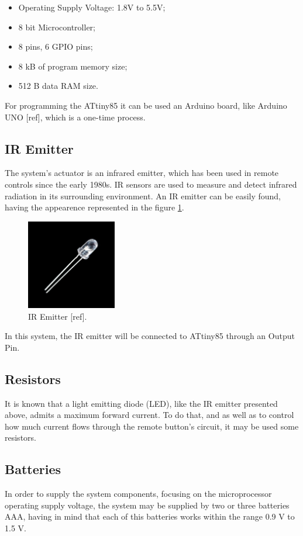 \documentclass[12pt, letterpaper]{report}
\begin{document}
\begin{itemize}
	\item Operating Supply Voltage: 1.8V to 5.5V;
	\item 8 bit Microcontroller;
	\item 8 pins, 6 GPIO pins;
	\item 8 kB of program memory size;
	\item 512 B data RAM size.
\end{itemize}

For programming the ATtiny85 it can be used an Arduino board, like Arduino UNO [ref], which is a one-time process.

\subsection{IR Emitter}
The system’s actuator is an infrared emitter, which has been used in remote controls since the early 1980s. IR sensors are used to measure and detect infrared radiation in its surrounding environment. An IR emitter can be easily found, having the appearence represented in the figure \ref{fig:iremitter}.

\begin{figure}[ht]
	\centering
	\includegraphics[width=0.35\textwidth]{iremitter}
	\caption{IR Emitter [ref].}
	\label{fig:iremitter}
\end{figure}

In this system, the IR emitter will be connected to ATtiny85 through an Output Pin.

\subsection{Resistors}
It is known that a light emitting diode (LED), like the IR emitter presented above, admits a maximum forward current. To do that, and as well as to control how much current flows through the remote button’s circuit, it may be used some resistors.

\subsection{Batteries}
In order to supply the system components, focusing on the microprocessor operating supply voltage, the system may be supplied by two or three batteries AAA, having in mind that each of this batteries works within the range 0.9 V to 1.5 V.
\end{document}
